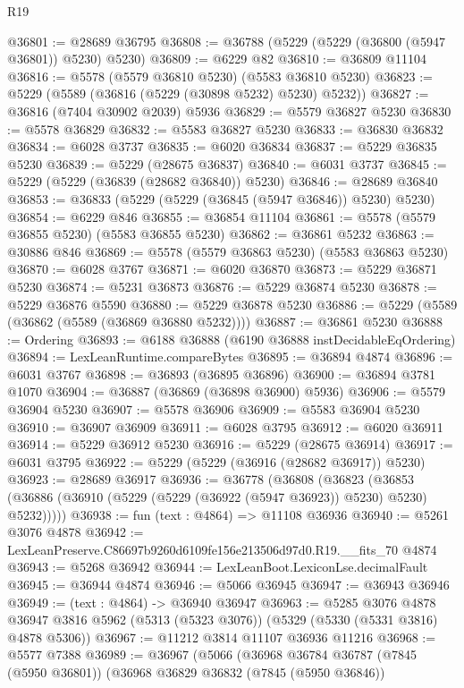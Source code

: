 \begin{lexlean}{R19}
\begin{coremodule}
@36801 := @28689 @36795
@36808 := @36788 (@5229 (@5229 (@36800 (@5947 @36801)) @5230) @5230)
@36809 := @6229 @82
@36810 := @36809 @11104
@36816 := @5578 (@5579 @36810 @5230) (@5583 @36810 @5230)
@36823 := @5229 (@5589 (@36816 (@5229 (@30898 @5232) @5230) @5232))
@36827 := @36816 (@7404 @30902 @2039) @5936
@36829 := @5579 @36827 @5230
@36830 := @5578 @36829
@36832 := @5583 @36827 @5230
@36833 := @36830 @36832
@36834 := @6028 @3737
@36835 := @6020 @36834
@36837 := @5229 @36835 @5230
@36839 := @5229 (@28675 @36837)
@36840 := @6031 @3737
@36845 := @5229 (@5229 (@36839 (@28682 @36840)) @5230)
@36846 := @28689 @36840
@36853 := @36833 (@5229 (@5229 (@36845 (@5947 @36846)) @5230) @5230)
@36854 := @6229 @846
@36855 := @36854 @11104
@36861 := @5578 (@5579 @36855 @5230) (@5583 @36855 @5230)
@36862 := @36861 @5232
@36863 := @30886 @846
@36869 := @5578 (@5579 @36863 @5230) (@5583 @36863 @5230)
@36870 := @6028 @3767
@36871 := @6020 @36870
@36873 := @5229 @36871 @5230
@36874 := @5231 @36873
@36876 := @5229 @36874 @5230
@36878 := @5229 @36876 @5590
@36880 := @5229 @36878 @5230
@36886 := @5229 (@5589 (@36862 (@5589 (@36869 @36880 @5232))))
@36887 := @36861 @5230
@36888 := Ordering
@36893 := @6188 @36888 (@6190 @36888 instDecidableEqOrdering)
@36894 := LexLeanRuntime.compareBytes
@36895 := @36894 @4874
@36896 := @6031 @3767
@36898 := @36893 (@36895 @36896)
@36900 := @36894 @3781 @1070
@36904 := @36887 (@36869 (@36898 @36900) @5936)
@36906 := @5579 @36904 @5230
@36907 := @5578 @36906
@36909 := @5583 @36904 @5230
@36910 := @36907 @36909
@36911 := @6028 @3795
@36912 := @6020 @36911
@36914 := @5229 @36912 @5230
@36916 := @5229 (@28675 @36914)
@36917 := @6031 @3795
@36922 := @5229 (@5229 (@36916 (@28682 @36917)) @5230)
@36923 := @28689 @36917
@36936 := @36778
    (@36808
      (@36823 (@36853 (@36886 (@36910 (@5229 (@5229 (@36922 (@5947 @36923)) @5230) @5230) @5232)))))
@36938 := fun (text : @4864) => @11108 @36936
@36940 := @5261 @3076 @4878
@36942 := LexLeanPreserve.C86697b9260d6109fe156e213506d97d0.R19.__fits_70 @4874
@36943 := @5268 @36942
@36944 := LexLeanBoot.LexiconLse.decimalFault
@36945 := @36944 @4874
@36946 := @5066 @36945
@36947 := @36943 @36946
@36949 := (text : @4864) -> @36940 @36947
@36963 := @5285
    @3076
    @4878
    @36947
    @3816
    @5962
    (@5313 (@5323 @3076))
    (@5329 (@5330 (@5331 @3816) @4878 @5306))
@36967 := @11212 @3814 @11107 @36936 @11216
@36968 := @5577 @7388
@36989 := @36967
    (@5066
      (@36968
        @36784
        @36787
        (@7845 (@5950 @36801))
        (@36968
          @36829
          @36832
          (@7845 (@5950 @36846))

\end{coremodule}
\end{lexlean}
